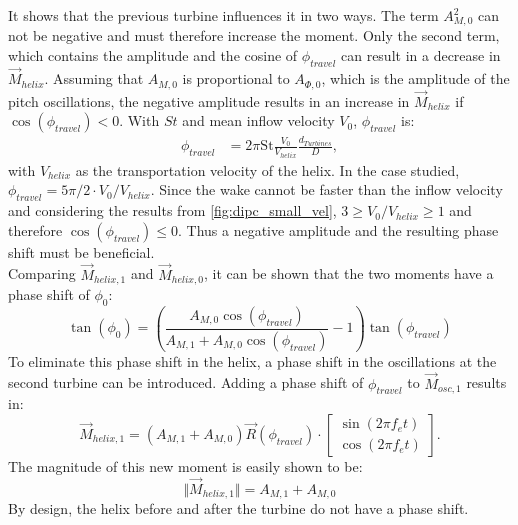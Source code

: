 It shows that the previous turbine influences it in two ways. The term $A_{M,0}^2$ can not be negative and must therefore increase the moment. Only the second term, which contains the amplitude and the cosine of $\phi_{travel}$ can result in a decrease in $\vec{M}_{helix}$. Assuming that $A_{M,0}$ is proportional to $A_{\Phi,0}$, which is the amplitude of the pitch oscillations, the negative amplitude results in an increase in $\vec{M}_{helix}$ if $\cos(\phi_{travel}) < 0$. With $St$ and mean inflow velocity $V_0$, $\phi_{travel}$ is:
\begin{align}
	\phi_{travel} & = 2 \pi \mathrm{St} \frac{V_0}{V_{helix}} \frac{d_{Turbines}}{D} \label{eq:phi_travel},
\end{align} 
with $V_{helix}$ as the transportation velocity of the helix. In the case studied, $\phi_{travel} = 5\pi/2 \cdot V_0 / V_{helix}$. Since the wake cannot be faster than the inflow velocity and considering the results from \autoref{fig:dipc_small_vel}, $ 3 \geq V_0/V_{helix} \geq 1$ and therefore $\cos(\phi_{travel})  \leq 0$. Thus a negative amplitude and the resulting phase shift must be beneficial.\\
Comparing $\vec{M}_{helix,1}$ and $\vec{M}_{helix,0}$, it can be shown that the two moments have a phase shift of $\phi_0$:
\begin{equation}
	\tan(\phi_0) = \left(\frac{A_{M,0} \cos(\phi_{travel})}{A_{M,1}+ A_{M,0} \cos(\phi_{travel})}-1\right) \tan(\phi_{travel}) \label{eq:phi_0}
\end{equation}
To eliminate this phase shift in the helix, a phase shift in the oscillations at the second turbine can be introduced. Adding a phase shift of $\phi_{travel}$ to $\vec{M}_{osc,1}$ results in:
\begin{equation}
	\vec{M}_{helix,1} = \left( A_{M,1} + A_{M,0} \right) \vec{R}(\phi_{travel}) \cdot
	\begin{bmatrix}
	\sin(2\pi f_e t) \\
	\cos(2\pi f_e t)
	\end{bmatrix} .
\end{equation}
The magnitude of this new moment is easily shown to be:
\begin{equation}
 \Vert\vec{M}_{helix,1}\Vert =  A_{M,1} + A_{M,0}
\end{equation}
By design, the helix before and after the turbine do not have a phase shift. \\
